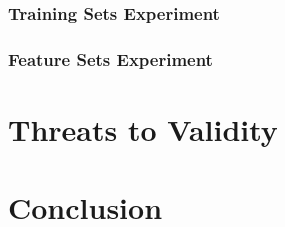 \documentclass{article}
\begin{document}

\subsubsection{Training Sets Experiment}

\subsubsection{Feature Sets Experiment}

\section{Threats to Validity}\label{sec:threats}



\section{Conclusion}\label{sec:conclude}



\end{document}
